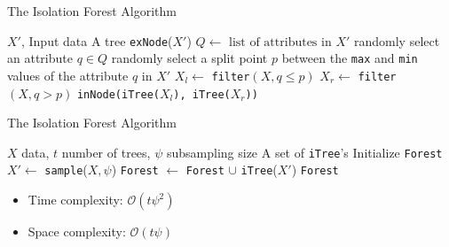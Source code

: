 \begin{frame}{The Isolation Forest Algorithm}

  \begin{algorithm}[H]
\caption{iTree($X'$)}\label{alg:cap}
\begin{algorithmic}[1]
  \Require $X'$, Input data
  \Ensure A tree
  \State \Return \texttt{exNode}($X'$)
  \EndIf
  \State $Q \gets \text{ list of attributes in } X'$
\State randomly select an attribute $q \in Q$
\State randomly select a split point $p$ between the \texttt{max} and \texttt{min} values of
the attribute $q$ in $X'$
\State $X_l \gets $ \texttt{filter}$(X, q \le p)$
\State $X_r \gets $ \texttt{filter}$(X, q > p)$
\State \Return \texttt{inNode(iTree(}$X_l$\texttt{), iTree(}$X_r$\texttt{))}
\end{algorithmic}
\end{algorithm}

\end{frame}
\newpage

\begin{frame}{The Isolation Forest Algorithm}

  \begin{algorithm}[H]
\caption{iForest($X$, $t$, $\psi$)}\label{alg2:cap}
\begin{algorithmic}[1]
  \Require $X$ data, $t$ number of trees, $\psi$ subsampling size
  \Ensure A set of \texttt{iTree}'s
  \State Initialize \texttt{Forest}
  \State $X' \gets $ \texttt{sample}($X, \psi$)
  \State \texttt{Forest} $\gets$ \texttt{Forest} $\cup$ \texttt{iTree}($X'$)
  \EndFor
  \State \Return \texttt{Forest}
\end{algorithmic}
\end{algorithm}
\pause
\begin{itemize}
  \item Time complexity: $\mathcal{O}(t\psi^2)$
  \item Space complexity: $\mathcal{O}(t\psi)$
\end{itemize}

\end{frame}
\newpage

